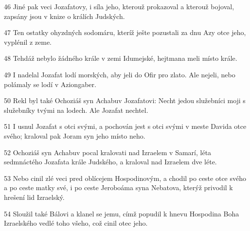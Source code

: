 \par 46 Jiné pak veci Jozafatovy, i síla jeho, kterouž prokazoval a kterouž bojoval, zapsány jsou v knize o králích Judských.
\par 47 Ten ostatky ohyzdných sodomáru, kteríž ješte pozustali za dnu Azy otce jeho, vyplénil z zeme.
\par 48 Tehdáž nebylo žádného krále v zemi Idumejské, hejtmana meli místo krále.
\par 49 I nadelal Jozafat lodí morských, aby jeli do Ofir pro zlato. Ale nejeli, nebo polámaly se lodí v Aziongaber.
\par 50 Rekl byl také Ochoziáš syn Achabuv Jozafatovi: Necht jedou služebníci moji s služebníky tvými na lodech. Ale Jozafat nechtel.
\par 51 I usnul Jozafat s otci svými, a pochován jest s otci svými v meste Davida otce svého; kraloval pak Joram syn jeho místo neho.
\par 52 Ochoziáš syn Achabuv pocal kralovati nad Izraelem v Samarí, léta sedmnáctého Jozafata krále Judského, a kraloval nad Izraelem dve léte.
\par 53 Nebo cinil zlé veci pred oblícejem Hospodinovým, a chodil po ceste otce svého a po ceste matky své, i po ceste Jeroboáma syna Nebatova, kterýž privodil k hrešení lid Izraelský.
\par 54 Sloužil také Bálovi a klanel se jemu, címž popudil k hnevu Hospodina Boha Izraelského vedlé toho všeho, což cinil otec jeho.

